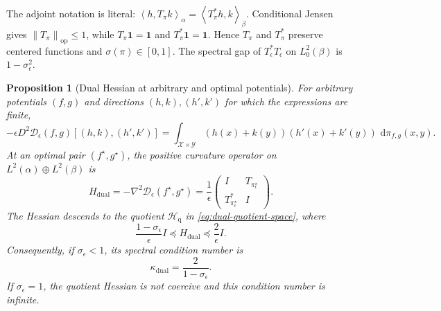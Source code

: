 \documentclass[11pt]{article}
\newtheorem{proposition}{Proposition}[section]
\theoremstyle{definition}
\theoremstyle{remark}
\newcommand{\eps}{\epsilon}
\newcommand{\one}{\mathbf{1}}
\newcommand{\al}{\alpha}
\newcommand{\be}{\beta}
\newcommand{\Xx}{\mathcal{X}}
\newcommand{\Yy}{\mathcal{Y}}
\newcommand{\Dd}{\mathcal{D}}
\newcommand{\dd}{\,\mathrm{d}}
\newcommand{\ip}[2]{\left\langle #1,#2\right\rangle}
\newcommand{\opnorm}[1]{\left\lVert #1\right\rVert_{\mathrm{op}}}
\begin{document}
The adjoint notation is literal:
$\ip{h}{T_\pi k}_{\al}=\ip{T_\pi^\ast h}{k}_{\be}$.
Conditional Jensen gives $\opnorm{T_\pi}\leq1$, while
$T_\pi\one=\one$ and $T_\pi^\ast\one=\one$. Hence $T_\pi$ and
$T_\pi^\ast$ preserve centered functions and $\sigma(\pi)\in[0,1]$.
The spectral gap of $T_\eps^\ast T_\eps$ on $L_0^2(\be)$ is
$1-\sigma_\eps^2$.

\begin{proposition}[Dual Hessian at arbitrary and optimal potentials]
  \label{prop:full-dual-hessian}
  For arbitrary potentials $(f,g)$ and directions $(h,k),(h',k')$ for
  which the expressions are finite,
  \begin{equation}
    \label{eq:general-dual-second-variation}
    -\eps D^2\Dd_\eps(f,g)[(h,k),(h',k')]
    =
    \int_{\Xx\times\Yy}
    (h(x)+k(y))(h'(x)+k'(y))\,\dd\pi_{f,g}(x,y).
  \end{equation}
  At an optimal pair $(f^\star,g^\star)$, the positive curvature
  operator on $L^2(\al)\oplus L^2(\be)$ is
  \begin{equation}
    \label{eq:full-dual-hessian}
    H_{\mathrm{dual}}
    =
    -\nabla^2\Dd_\eps(f^\star,g^\star)
    =
    \frac1\eps
    \begin{pmatrix}
      I&T_{\pi_\eps^\star}\\
      T_{\pi_\eps^\star}^\ast&I
    \end{pmatrix}.
  \end{equation}
  The Hessian descends to the quotient
  $\mathcal H_{\mathrm q}$ in \eqref{eq:dual-quotient-space}, where
  \begin{equation}
    \label{eq:full-dual-quotient-curvature}
    \frac{1-\sigma_\eps}{\eps}I
    \preceq H_{\mathrm{dual}}
    \preceq
    \frac{2}{\eps}I.
  \end{equation}
  Consequently, if $\sigma_\eps<1$, its spectral condition number is
  \begin{equation}
    \label{eq:full-dual-condition}
    \kappa_{\mathrm{dual}}
    =
    \frac{2}{1-\sigma_\eps}.
  \end{equation}
  If $\sigma_\eps=1$, the quotient Hessian is not coercive and this
  condition number is infinite.
\end{proposition}
\end{document}
